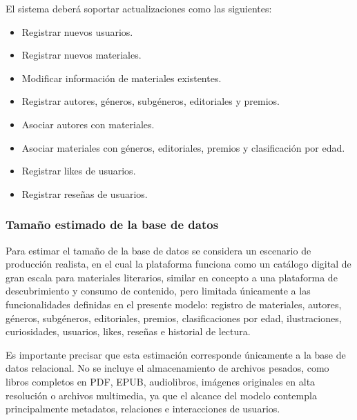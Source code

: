 \documentclass[12pt,a4paper]{article}
\begin{document}
El sistema deberá soportar actualizaciones como las siguientes:

\begin{itemize}
    \item Registrar nuevos usuarios.
    \item Registrar nuevos materiales.
    \item Modificar información de materiales existentes.
    \item Registrar autores, géneros, subgéneros, editoriales y premios.
    \item Asociar autores con materiales.
    \item Asociar materiales con géneros, editoriales, premios y clasificación por edad.
    \item Registrar likes de usuarios.
    \item Registrar reseñas de usuarios.
\end{itemize}

\subsubsection{Tamaño estimado de la base de datos}

Para estimar el tamaño de la base de datos se considera un escenario de producción realista, en el cual la plataforma funciona como un catálogo digital de gran escala para materiales literarios, similar en concepto a una plataforma de descubrimiento y consumo de contenido, pero limitada únicamente a las funcionalidades definidas en el presente modelo: registro de materiales, autores, géneros, subgéneros, editoriales, premios, clasificaciones por edad, ilustraciones, curiosidades, usuarios, likes, reseñas e historial de lectura.

Es importante precisar que esta estimación corresponde únicamente a la base de datos relacional. No se incluye el almacenamiento de archivos pesados, como libros completos en PDF, EPUB, audiolibros, imágenes originales en alta resolución o archivos multimedia, ya que el alcance del modelo contempla principalmente metadatos, relaciones e interacciones de usuarios.
\end{document}
